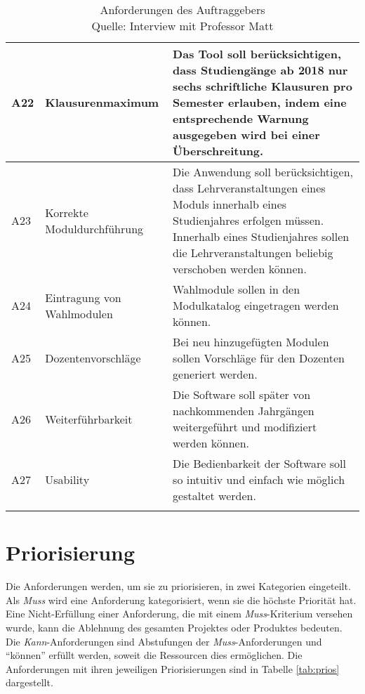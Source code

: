 \begin{longtable}[h]{|p{}|p{4cm}|p{}|}
	\parbox[t]{3cm}{A22} & Klausurenmaximum & Das Tool soll berücksichtigen, dass Studiengänge ab 2018  nur sechs schriftliche Klausuren pro Semester erlauben, indem eine entsprechende Warnung ausgegeben wird bei einer Überschreitung.\\ \hline
	\parbox[t]{3cm}{A23} & Korrekte Moduldurchführung  & Die Anwendung soll berücksichtigen, dass Lehrveranstaltungen eines Moduls innerhalb eines Studienjahres erfolgen müssen. Innerhalb eines Studienjahres sollen die Lehrveranstaltungen beliebig verschoben werden können.\\ \hline
	\parbox[t]{3cm}{A24} & Eintragung von Wahlmodulen & Wahlmodule sollen in den Modulkatalog eingetragen werden können.\\ \hline
	\parbox[t]{3cm}{A25} & Dozentenvorschläge & Bei neu hinzugefügten Modulen sollen Vorschläge für den Dozenten generiert werden.\\ \hline
	\parbox[t]{3cm}{A26} & Weiterführbarkeit & Die Software soll später von nachkommenden Jahrgängen weitergeführt und modifiziert werden können.\\ \hline
	\parbox[t]{3cm}{A27} & Usability & Die Bedienbarkeit der Software soll so intuitiv und einfach wie möglich gestaltet werden.\\ \hline
	
	\captionsetup{format=hang}
	\caption[Anforderungen des Auftraggebers]{\label{tab:Anforderungen}Anforderungen des Auftraggebers\\Quelle: Interview mit Professor Matt}
\end{longtable}


\section{Priorisierung}
Die Anforderungen werden, um sie zu priorisieren, in zwei Kategorien eingeteilt.
Als \textit{Muss} wird eine Anforderung kategorisiert, wenn sie die höchste Priorität hat.
Eine Nicht-Erfüllung einer Anforderung, die mit einem \textit{Muss}-Kriterium versehen wurde, kann die Ablehnung des gesamten Projektes oder Produktes bedeuten.
Die \textit{Kann}-Anforderungen sind Abstufungen der \textit{Muss}-Anforderungen und \enquote{können} erfüllt werden, soweit die Ressourcen dies ermöglichen.
Die Anforderungen mit ihren jeweiligen Priorisierungen sind in Tabelle \vref{tab:prios} dargestellt. 

